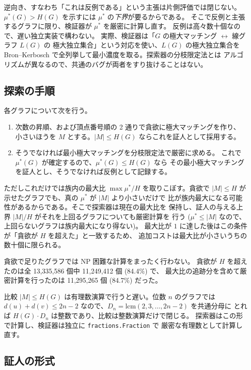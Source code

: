 \documentclass[paper=a4,fontsize=10.5pt,jafontsize=10.5pt]{jlreq}
\theoremstyle{plain}
\theoremstyle{definition}
\begin{document}
逆向き、すなわち「これは反例である」という主張は片側評価では閉じない。
$\mu^*(G) > H(G)$ を示すには $\mu^*$ の\emph{下界}が要るからである。
そこで反例と主張するグラフに限り、検証器が $\mu^*$ を厳密に計算し直す。
反例は高々数十個なので、遅い独立実装で構わない。
実際、検証器は「$G$ の極大マッチング $\leftrightarrow$ 線グラフ $L(G)$ の
極大独立集合」という対応を使い、$L(G)$ の極大独立集合を
Bron--Kerbosch で全列挙して最小濃度を取る。探索器の分枝限定法とは
アルゴリズムが異なるので、共通のバグが両者をすり抜けることはない。

\subsection{探索の手順}

各グラフについて次を行う。

\begin{enumerate}
\item 次数の昇順、および頂点番号順の 2 通りで貪欲に極大マッチングを作り、
  小さいほうを $M$ とする。$|M| \le H(G)$ ならこれを証人として採用する。
\item そうでなければ最小極大マッチングを分枝限定法で厳密に求める。
  これで $\mu^*(G)$ が確定するので、$\mu^*(G) \le H(G)$ なら
  その最小極大マッチングを証人とし、そうでなければ反例として記録する。
\end{enumerate}

ただしこれだけでは族内の最大比 $\max \mu^*/H$ を取りこぼす。貪欲で
$|M| \le H$ が示せたグラフでも、真の $\mu^*$ が $|M|$ より小さいだけで
比が族内最大になる可能性があるからである。そこで探索器は現在の最大比を
保持し、証人の与える上界 $|M|/H$ がそれを上回るグラフについても厳密計算を
行う ($\mu^* \le |M|$ なので、上回らないグラフは族内最大になり得ない)。
最大比が $1$ に達した後はこの条件が「貪欲が $H$ を超えた」と一致するため、
追加コストは最大比が小さいうちの数十個に限られる。

貪欲で足りたグラフでは NP 困難な計算をまったく行わない。
貪欲が $H$ を超えたのは全 13,335,586 個中 11,249,412 個 (84.4\%) で、
最大比の追跡分を含めて厳密計算を行ったのは 11,295,265 個
(84.7\%) だった。

比較 $|M| \le H(G)$ は有理数演算で行うと遅い。位数 $n$ のグラフでは
$d(u)+d(v) \le 2n-2$ なので、$D_n = \mathrm{lcm}(2, 3, \dots, 2n-2)$ を共通分母に
とれば $H(G) \cdot D_n$ は整数であり、比較は整数演算だけで閉じる。
探索器はこの形で計算し、検証器は独立に \texttt{fractions.Fraction} で
厳密な有理数として計算し直す。

\subsection{証人の形式}
\end{document}
